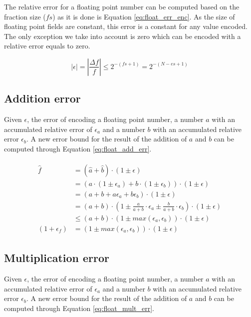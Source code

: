 The relative error for a floating point number can be computed based on the fraction size ($fs$) as it is done is Equation \ref{eq:float_err_enc}. As the size of floating point fields are constant, this error is a constant for any value encoded. The only exception we take into account is zero which can be encoded with a relative error equals to zero.

\begin{equation}
	|\epsilon| = \left| \frac{\Delta f}{f} \right| \leq 2^{-(fs+1)} = 2^{-(N-es+1)}
	\label{eq:float_err_enc}
\end{equation}

\subsection{Addition error}
Given $\epsilon$, the error of encoding a floating point number, a number $a$ with an accumulated relative error of $\epsilon_a$ and a number $b$ with an accumulated relative error $\epsilon_b$. A new error bound for the result of the addition of $a$ and $b$ can be computed through Equation \ref{eq:float_add_err}.

\begin{align}
\begin{split}
\hat{f} &= (\hat{a} + \hat{b}) \cdot (1 \pm \epsilon)\\
		&= (a \cdot (1 \pm \epsilon_a) + b \cdot (1 \pm \epsilon_b))\cdot (1 \pm \epsilon)\\
		&= (a + b + a \epsilon_a + b \epsilon_b) \cdot (1 \pm \epsilon) \\
		&= (a + b) \cdot \left(1 \pm \frac{a}{a + b} \cdot \epsilon_a \pm \frac{b}{a+b} \cdot \epsilon_b \right) \cdot (1 \pm \epsilon) \\
		&\leq (a+b) \cdot (1 \pm max(\epsilon_a, \epsilon_b)) \cdot (1 \pm \epsilon)\\
(1+\epsilon_f) &= (1 \pm max(\epsilon_a, \epsilon_b)) \cdot (1 \pm \epsilon)
\end{split}
\label{eq:float_add_err}
\end{align}

\subsection{Multiplication error}
Given $\epsilon$, the error of encoding a floating point number, a number $a$ with an accumulated relative error of $\epsilon_a$ and a number $b$ with an accumulated relative error $\epsilon_b$. A new error bound for the result of the addition of $a$ and $b$ can be computed through Equation \ref{eq:float_mult_err}.

